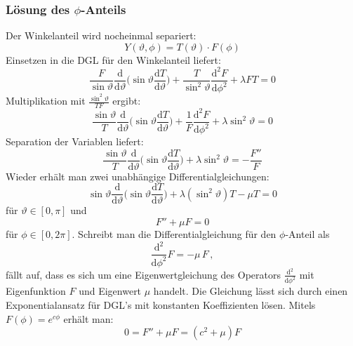 \documentclass[9pt]{report}
\begin{document}
\subsubsection{Lösung des $\phi$-Anteils}
Der Winkelanteil wird nocheinmal separiert:
\begin{equation}
Y(\vartheta,\phi)=T(\vartheta)\cdot F(\phi)
\end{equation}
Einsetzen in die DGL für den Winkelanteil liefert:
\begin{equation}
\frac{F}{\sin\vartheta}\frac{\mathrm{d}}{\mathrm{d}\vartheta}\Big(\sin\vartheta\frac{\mathrm{d}T}{\mathrm{d}\vartheta}\Big)+\frac{T}{\sin^{2}\vartheta}\frac{\mathrm{d}^{2}F}{\mathrm{d}\phi^{2}}+\lambda FT=0
\end{equation}
Multiplikation mit $\frac{\sin^{2}\vartheta}{TF}$ ergibt:
\begin{equation}
\frac{\sin\vartheta}{T}\frac{\mathrm{d}}{\mathrm{d}\vartheta}\Big(\sin\vartheta\frac{\mathrm{d}T}{\mathrm{d}\vartheta}\Big)+\frac{1}{F}\frac{\mathrm{d}^{2}F}{\mathrm{d}\phi^{2}}+\lambda\sin^{2}\vartheta=0
\end{equation}
Separation der Variablen liefert:
\begin{equation}
\frac{\sin\vartheta}{T}\frac{\mathrm{d}}{\mathrm{d}\vartheta}\Big(\sin\vartheta\frac{\mathrm{d}T}{\mathrm{d}\vartheta}\Big)+\lambda\sin^{2}\vartheta=-\frac{F''}{F}
\end{equation}
Wieder erhält man zwei unabhängige Differentialgleichungen:
\begin{equation}
\sin\vartheta\frac{\mathrm{d}}{\mathrm{d}\vartheta}\Big(\sin\vartheta\frac{\mathrm{d}T}{\mathrm{d}\vartheta}\Big)+\lambda(\sin^{2}\vartheta)T-\mu T=0
\end{equation}
für $\vartheta\in[0,\pi]$ und
\begin{equation}
F''+\mu F=0
\end{equation}
für $\phi\in[0,2\pi]$.
Schreibt man die Differentialgleichung für den $\phi$-Anteil als
\begin{equation}
\frac{\mathrm{d}^{2}}{\mathrm{d}\phi^{2}}F=-\mu\,F\,,
\end{equation}
fällt auf, dass es sich um eine Eigenwertgleichung des Operators $\frac{\mathrm{d}^{2}}{\mathrm{d}\phi^{2}}$ mit Eigenfunktion $F$ und Eigenwert $\mu$ handelt. Die Gleichung lässt sich durch einen Exponentialansatz für DGL's mit konstanten Koeffizienten lösen. Mitels $F(\phi)=e^{c\phi}$ erhält man:
\begin{equation}
0=F''+\mu F=(c^2+\mu)F
\end{equation}
\end{document}
